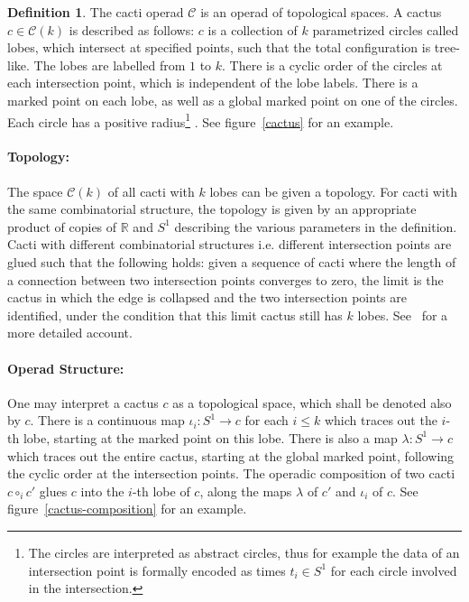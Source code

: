 \documentclass{scrartcl}
\theoremstyle{plain}
\theoremstyle{definition}
\newtheorem{definition}[theorem]{Definition}
\newcommand{\R}{\mathbb{R}}
\newcommand{\comp}{\circ}
\begin{document}
\begin{definition}
    The cacti operad $\mathcal C$ is an operad of topological spaces. A cactus $c\in \mathcal C(k)$ is described as follows: $c$ is a collection of $k$ parametrized circles called lobes, which intersect at specified points, such that the total configuration is tree-like. The lobes are labelled from $1$ to $k$. There is a cyclic order of the circles at each intersection point, which is independent of the lobe labels. There is a marked point on each lobe, as well as a global marked point on one of the circles. Each circle has a positive radius\footnote{The circles are interpreted as abstract circles, thus for example the data of an intersection point is formally encoded as times $t_i\in S^1$ for each circle involved in the intersection. } . See figure~\ref{cactus} for an example.

    \paragraph{Topology:} The space $\mathcal C(k)$ of all cacti with $k$ lobes can be given a topology. For cacti with the same combinatorial structure, the topology is given by an appropriate product of copies of $\R$ and $S^1$ describing the various parameters in the definition. Cacti with different combinatorial structures i.e. different intersection points are glued such that the following holds: given a sequence of cacti where the length of a connection between two intersection points converges to zero, the limit is the cactus in which the edge is collapsed and the two intersection points are identified, under the condition that this limit cactus still has $k$ lobes. See~\cite{cohen2006string} for a more detailed account. 

    \paragraph{Operad Structure:} One may interpret a cactus $c$ as a topological space, which shall be denoted also by $c$. There is a continuous map $\iota_i \colon S^1 \to c$ for each $i\leq k$ which traces out the $i$-th lobe, starting at the marked point on this lobe. There is also a map $\lambda\colon S^1\to c$ which traces out the entire cactus, starting at the global marked point, following the cyclic order at the intersection points. The operadic composition of two cacti $c \comp_i c'$ glues $c$ into the $i$-th lobe of $c$, along the maps $\lambda$ of $c'$ and $\iota_i$ of $c$. See figure~\ref{cactus-composition} for an example.


\end{definition}
\end{document}
